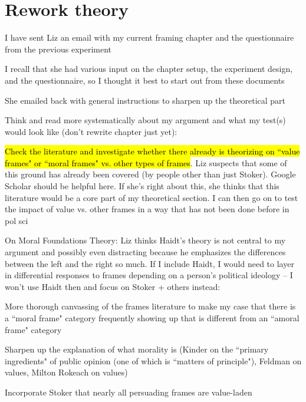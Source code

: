 \section*{Rework theory}
	\begin{coi}
		\item I have sent Liz an email with my current framing chapter and the questionnaire from the previous experiment
		\item I recall that she had various input on the chapter setup, the experiment design, and the questionnaire, so I thought it best to start out from these documents
		\item She emailed back with general instructions to sharpen up the theoretical part
		\item Think and read more systematically about my argument and what my test(s) would look like (don't rewrite chapter just yet):
			\begin{coi}
				\item \hl{Check the literature and investigate whether there already is theorizing on ``value frames" or ``moral frames" vs. other types of frames}. Liz suspects that some of this ground has already been covered (by people other than just Stoker). Google Scholar should be helpful here. If she's right about this, she thinks that this literature would be a core part of my theoretical section. I can then go on to test the impact of value vs. other frames in a way that has not been done before in pol sci
				\item On Moral Foundations Theory: Liz thinks Haidt's theory is not central to my argument and possibly even distracting because he emphasizes the differences between the left and the right so much. If I include Haidt, I would need to layer in differential responses to frames depending on a person's political ideology -- I won't use Haidt then and focus on Stoker + others instead:
					\begin{coi}
						\item More thorough canvassing of the frames literature to make my case that there is a ``moral frame" category frequently showing up that is different from an ``amoral frame" category
						\item Sharpen up the explanation of what morality is (Kinder on the ``primary ingredients" of public opinion (one of which is ``matters of principle"), Feldman on values, Milton Rokeach on values)
						\item Incorporate Stoker that nearly all persuading frames are value-laden
					\end{coi}

\end{coi}
\end{coi}
